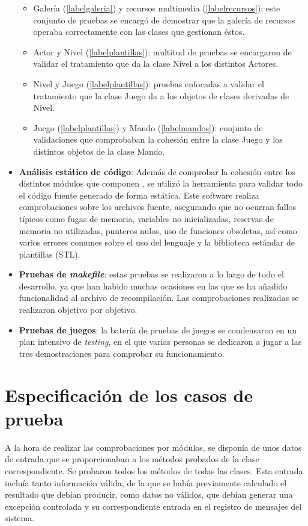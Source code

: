 \begin{itemize}
\begin{itemize}
	\item Galería (\ref{labelgaleria}) y recursos multimedia (\ref{labelrecursos}): este conjunto de pruebas se encargó de demostrar que la galería de recursos operaba correctamente con las clases que gestionan éstos.
	\item Actor y Nivel (\ref{labelplantillas}): multitud de pruebas se encargaron de validar el tratamiento que da la clase Nivel a los distintos Actores.
	\item Nivel y Juego (\ref{labelplantillas}): pruebas enfocadas a validar el tratamiento que la clase Juego da a los objetos de clases derivadas de Nivel.
	\item Juego (\ref{labelplantillas}) y Mando (\ref{labelmandos}): conjunto de validaciones que comprobaban la cohesión entre la clase Juego y los distintos objetos de la clase Mando.
	\end{itemize}
\item \textbf{Análisis estático de código}: Además de comprobar la cohesión entre los distintos módulos que componen , se utilizó la herramienta  para validar todo el código fuente generado de forma estática. Este software realiza comprobaciones sobre los archivos fuente, asegurando que no ocurran fallos típicos como fugas de memoria, variables no inicializadas, reservas de memoria no utilizadas, punteros nulos, uso de funciones obsoletas, así como varios errores comunes sobre el uso del lenguaje y la biblioteca estándar de plantillas (STL).
\item \textbf{Pruebas de \emph{makefile}}: estas pruebas se realizaron a lo largo de todo el desarrollo, ya que han habido muchas ocasiones en las que se ha añadido funcionalidad al archivo de recompilación. Las comprobaciones realizadas se realizaron objetivo por objetivo.
\item \textbf{Pruebas de juegos}: la batería de pruebas de juegos se condensaron en un plan intensivo de \emph{testing}, en el que varias personas se dedicaron a jugar a las tres demostraciones para comprobar su funcionamiento.
\end{itemize}

\section{Especificación de los casos de prueba}

A la hora de realizar las comprobaciones por módulos, se disponía de unos datos de entrada que se proporcionaban a los métodos probados de la clase correspondiente. Se probaron todos los métodos de todas las clases. Esta entrada incluía tanto información válida, de la que se había previamente calculado el resultado que debían producir, como datos no válidos, que debían generar una excepción controlada y su correspondiente entrada en el registro de mensajes del sistema.\\

